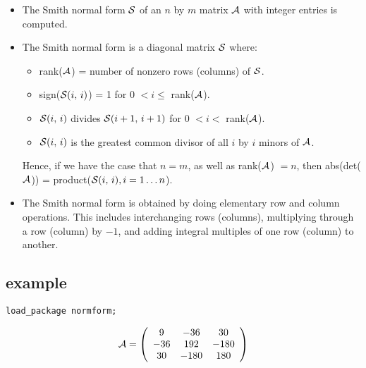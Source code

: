 \begin{itemize}
\item The Smith normal form ${\cal S}$ of an $n$ by $m$ matrix
${\cal A}$ with integer entries is computed.

\item The Smith normal form is a diagonal matrix ${\cal S}$ where:

  \begin{itemize}
  \item rank(${\cal A}$) = number of nonzero rows (columns) of
        ${\cal S}$.
  \item sign(${\cal S}(i,\, i)$) = 1 for 0 $< i \leq $ rank(${\cal A}$).
  \item ${\cal S}(i,\, i)$ divides ${\cal S}(i+1,\, i+1)$ for 0 $< i
        <$ rank(${\cal A}$).
  \item ${\cal S}(i,\,i)$ is the greatest common divisor of all $i$ by
        $i$ minors of ${\cal A}$.
  \end{itemize}

      Hence, if we have the case that $n = m$, as well as
      rank(${\cal A}$) $= n$, then abs(det(${\cal A}$)) =
      product(${\cal S}(i,\,i),i=1\ldots n$).

\item The Smith normal form is obtained by doing elementary row and
      column operations. This includes interchanging rows (columns),
      multiplying through a row (column) by $-1$, and adding integral
      multiples of one row (column) to another.
\end{itemize}

\subsection{example}

{\tt load\_package normform;}

\begin{displaymath}
{\cal A} = \left( \begin{array}{ccc} 9 & -36 & 30 \\ -36 & 192 & -180 \\
30 & -180 & 180  \end{array}
\right)
\end{displaymath}

